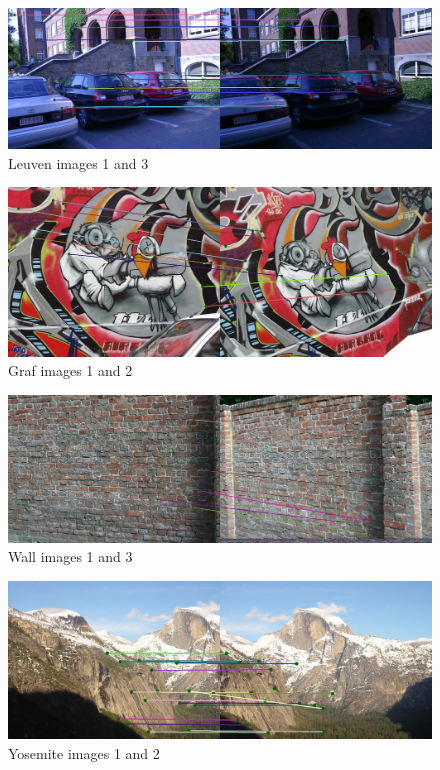 \documentclass[10pt,twocolumn,letterpaper]{article}
\begin{document}
\begin{figure}[ht!]
\centering
\includegraphics[width=1\textwidth]{img/leuven1_3_ratio.eps}
\caption{Leuven images 1 and 3}
\label{fig:leuven}
\end{figure}

\begin{figure}[ht!]
\centering
\includegraphics[width=1\textwidth]{img/graf1_2_ratio.eps}
\caption{Graf images 1 and 2}
\label{fig:graf}
\end{figure}

\begin{figure}[ht!]
\centering
\includegraphics[width=1\textwidth]{img/wall1_3_ratio.eps}
\caption{Wall images 1 and 3}
\label{fig:wall}
\end{figure}

\begin{figure}[ht!]
\centering
\includegraphics[width=1\textwidth]{img/Yosemite1_2_ratio.eps}
\caption{Yosemite images 1 and 2}
\label{fig:yosemite}
\end{figure}
\end{document}
